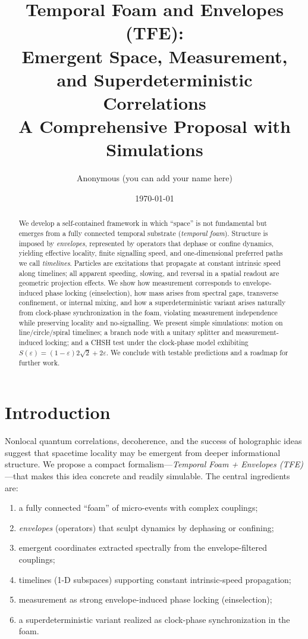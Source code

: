 \documentclass[11pt]{article}
\title{\textbf{Temporal Foam and Envelopes (TFE):\\
Emergent Space, Measurement, and Superdeterministic Correlations}\\[4pt]
\large A Comprehensive Proposal with Simulations}
\author{Anonymous (you can add your name here)}
\date{\today}
\begin{document}
\maketitle

\begin{abstract}
We develop a self-contained framework in which ``space'' is not fundamental but emerges from a fully connected temporal substrate (\emph{temporal foam}). Structure is imposed by \emph{envelopes}, represented by operators that dephase or confine dynamics, yielding effective locality, finite signalling speed, and one-dimensional preferred paths we call \emph{timelines}. Particles are excitations that propagate at constant intrinsic speed along timelines; all apparent speeding, slowing, and reversal in a spatial readout are geometric projection effects. We show how measurement corresponds to envelope-induced phase locking (einselection), how mass arises from spectral gaps, transverse confinement, or internal mixing, and how a superdeterministic variant arises naturally from clock-phase synchronization in the foam, violating measurement independence while preserving locality and no-signalling. We present simple simulations: motion on line/circle/spiral timelines; a branch node with a unitary splitter and measurement-induced locking; and a CHSH test under the clock-phase model exhibiting $S(\varepsilon)=(1-\varepsilon)2\sqrt2+2\varepsilon$. We conclude with testable predictions and a roadmap for further work.
\end{abstract}

\tableofcontents

\section{Introduction}

Nonlocal quantum correlations, decoherence, and the success of holographic ideas suggest that spacetime locality may be emergent from deeper informational structure. We propose a compact formalism---\emph{Temporal Foam + Envelopes (TFE)}---that makes this idea concrete and readily simulable. The central ingredients are:
\begin{enumerate}[label=(\roman*)]
\item a fully connected ``foam'' of micro-events with complex couplings;
\item \emph{envelopes} (operators) that sculpt dynamics by dephasing or confining;
\item emergent coordinates extracted spectrally from the envelope-filtered couplings;
\item timelines (1-D subspaces) supporting constant intrinsic-speed propagation;
\item measurement as strong envelope-induced phase locking (einselection);
\item a superdeterministic variant realized as clock-phase synchronization in the foam.
\end{enumerate}
\end{document}
